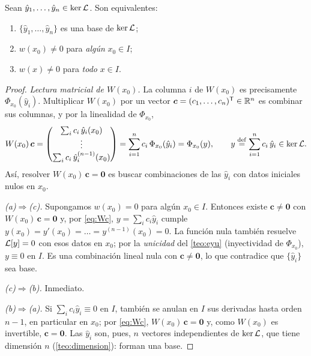 \begin{proposicion}\label{prop:wronskiano}
Sean $\hat y_1,\dots,\hat y_n\in\operatorname{ker}\mathcal{L}$. Son equivalentes:
\begin{enumerate}[label=\textup{(\alph*)}]
  \item $\{\hat y_1,\dots,\hat y_n\}$ es una base de $\operatorname{ker}\mathcal{L}$;
  \item $w(x_0)\neq0$ para \emph{algún} $x_0\in I$;
  \item $w(x)\neq0$ para \emph{todo} $x\in I$.
\end{enumerate}
\end{proposicion}

\begin{proof}
\emph{Lectura matricial de $W(x_0)$.} La columna $i$ de $W(x_0)$ es
precisamente $\Phi_{x_0}(\hat y_i)$. Multiplicar $W(x_0)$ por un vector
$\bm c=(c_1,\dots,c_n)^{\mathsf{T}}\in\mathbb{R}^{n}$ es combinar sus columnas, y por la
linealidad de $\Phi_{x_0}$,
\begin{equation}\label{eq:Wc}
  W(x_0)\,\bm c
  =\begin{pmatrix}
     \sum_i c_i\,\hat y_i(x_0)\\ \vdots\\ \sum_i c_i\,\hat y_i^{(n-1)}(x_0)
   \end{pmatrix}
  =\sum_{i=1}^{n}c_i\,\Phi_{x_0}(\hat y_i)
  =\Phi_{x_0}(y),\qquad y\mathrel{\overset{\mathrm{def}}{=}}\sum_{i=1}^{n}c_i\,\hat y_i\in\operatorname{ker}\mathcal{L} .
\end{equation}
Así, resolver $W(x_0)\,\bm c=\bm 0$ es buscar combinaciones de las $\hat y_i$
con datos iniciales nulos en $x_0$.

\emph{(a)$\Rightarrow$(c).} Supongamos $w(x_0)=0$ para algún $x_0\in I$.
Entonces existe $\bm c\neq\bm 0$ con $W(x_0)\,\bm c=\bm 0$ y, por
\eqref{eq:Wc}, $y=\sum_ic_i\hat y_i$ cumple
$y(x_0)=y'(x_0)=\dots=y^{(n-1)}(x_0)=0$. La función nula también resuelve
$\mathcal{L}[y]=0$ con esos datos en $x_0$; por la \emph{unicidad} del
\cref{teo:eyu} (inyectividad de $\Phi_{x_0}$), $y\equiv0$ en $I$. Es una
combinación lineal nula con $\bm c\neq\bm 0$, lo que contradice que
$\{\hat y_i\}$ sea base.

\emph{(c)$\Rightarrow$(b).} Inmediato.

\emph{(b)$\Rightarrow$(a).} Si $\sum_ic_i\hat y_i\equiv0$ en $I$, también se
anulan en $I$ sus derivadas hasta orden $n-1$, en particular en $x_0$; por
\eqref{eq:Wc}, $W(x_0)\,\bm c=\bm 0$ y, como $W(x_0)$ es invertible,
$\bm c=\bm 0$. Las $\hat y_i$ son, pues, $n$ vectores independientes de
$\operatorname{ker}\mathcal{L}$, que tiene dimensión $n$ (\cref{teo:dimension}): forman una base.
\end{proof}

